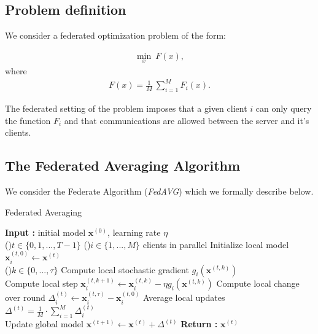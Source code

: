 \subsection{Problem definition}

We consider a federated optimization problem of the form:

\begin{align*}
    \underset{x}{\min}~ F(x),
\end{align*}
where
\begin{align*}
    F(x) =  \frac{1}{M}~ \sum_{i=1}^M F_i(x).
\end{align*}

The federated setting of the problem imposes that a given client $i$ can only query the function $F_i$ and that communications are allowed between the server and it's clients.


\subsection{The Federated Averaging Algorithm}

We consider the Federate Algorithm (\textit{FedAVG}) which we formally describe below.




\begin{algorithm}
    \caption{Federated Averaging}
    \label{FedAVG}
    \textbf{Input : } initial model $\bm{x}^(0)$, learning rate $\eta$ \\
    \For(){$t \in \{0,1,...,T-1\} $}{
        \For(){$i \in \{1,...,M\} $ clients in parallel}{
            Initialize local model $\bm{x}^{(t,0)}_i \leftarrow \bm{x}^{(t)}$ \\
            \For(){$k \in \{0,...,\tau\} $}{
                Compute local stochastic gradient ${g_i}(\bm{x}^{(t,k)})$ \\
                Compute local step $\bm{x}_i^{(t,k+1)} \leftarrow \bm{x}_i^{(t,k)} - \eta {g_i}(\bm{x}^{(t,k)})$
            }
            Compute local change over round $\Delta_i^{(t)} \leftarrow \bm{x}_i^{(t,\tau)} - \bm{x}_i ^{(t,0)}$
        }
        Average local updates $\Delta^{(t)} = \frac{1}{M} \cdot \sum_{i=1}^M \Delta_i^{(t)}$ \\
        Update global model $\bm{x}^{(t+1)} \leftarrow \bm{x}^{(t)} + \Delta^{(t)}$ 
    }
    \textbf{Return :} $\bm{x}^{(t)}$
\end{algorithm}

